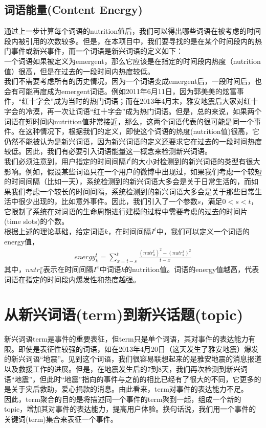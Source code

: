 \documentclass[a4paper]{article}
\begin{document}
\subsection{词语能量(Content Energy)}
通过上一步计算每个词语的nutrition值后，我们可以得出哪些词语在被考虑的时间段内被引用的次数较多。但是，在本项目中，我们要寻找的是在某个时间段内的热门事件或新兴事件，而一个词语是新兴词语的定义如下：\\
\indent 一个词语如果被定义为emergent，那么它应该是在指定的时间段内热度（nutrition值）很高，但是在过去的一段时间内热度较低。\\
\indent 我们不需要考虑所有的历史情况，因为一个词语变成emergent后，一段时间后，也会有可能再度成为emergent词语。例如2011年6月11日，因为郭美美的炫富事件，“红十字会”成为当时的热门词语；而在2013年4月末，雅安地震后大家对红十字会的冷漠，再一次让词语“红十字会”成为热门词语。但是，总的来说，如果两个词语在短时间内nutrition值非常接近，那么，这两个词语代表的很可能是同一个事件。在这种情况下，根据我们的定义，即使这个词语的热度(nutrition值)很高，它仍然不能被认为是新兴词语，因为新兴词语的定义还要求它在过去的一段时间热度较低。因此，我们有必要引入词语能量这一概念来检测新兴词语。\\
\indent 我们必须注意到，用户指定的时间间隔$I^t$的大小对检测到的新兴词语的类型有很大影响。例如，假设某些词语只在一个用户的微博中出现过，如果我们考虑一个较短的时间间隔（比如一天），系统检测到的新兴词语大多会是关于日常生活的，而如果我们考虑一个较长的时间间隔，系统检测到的新兴词语大多会是关于那些日常生活中很少出现的，比如意外事件。因此，我们引入了一个参数$s$，满足$0<s<t$，它限制了系统在对词语的生命周期进行建模的过程中需要考虑的过去的时间片(time slots)的个数。\\
\indent 根据上述的理论基础，给定词语$k$，在时间间隔$I^t$中，我们可以定义一个词语的energy值，
\begin{align}
    energy_k^t=\sum_{x=t-s}^{t} \frac{(nutr_k^t)^2-(nutr_k^x)^2} {t-x}
\end{align}
其中，$nutr_k^x$表示在时间间隔$I^x$中词语$k$的nutrition值。词语的energy值越高，代表词语在指定的时间段内爆发性和热度越强。



\section{从新兴词语(term)到新兴话题(topic)}
新兴词语term是事件的重要表征，但term只是单个词语，其对事件的表达能力有限。即使是表征性较强的词语，如在2013年4月20日（这天发生了雅安地震）爆发的新兴词语“地震”。见到这个词语，我们很容易联想起来的是雅安地震的消息报道以及救援工作的进展。但是，在地震发生后的7到8天，我们再次检测到新兴词语“地震”，但此时“地震”指向的事件与之前的相比已经有了很大的不同，它更多的是关于灾后救助，爱心捐款的消息。由此看来，term对事件的表达能力不足。\\
\indent 因此，term聚合的目的是将描述同一个事件的term聚到一起，组成一个新的topic，增加其对事件的表达能力，提高用户体验。换句话说，我们用一个事件的关键词(term)集合来表征一个事件。
\end{document}
